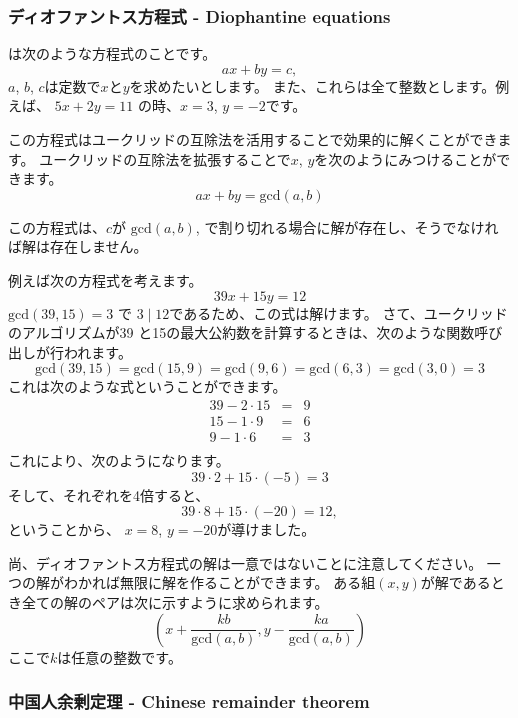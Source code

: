 \subsubsection*{ディオファントス方程式 - Diophantine equations}


は次のような方程式のことです。
\[ ax + by = c, \]
$a$, $b$, $c$は定数で$x$と$y$を求めたいとします。
また、これらは全て整数とします。例えば、
$5x+2y=11$ の時、$x=3$,  $y=-2$です。


この方程式はユークリッドの互除法を活用することで効果的に解くことができます。
ユークリッドの互除法を拡張することで$x$, $y$を次のようにみつけることができます。
\[
ax + by = \textrm{gcd}(a,b)
\]

この方程式は、$c$が
$\textrm{gcd}(a,b)$,
で割り切れる場合に解が存在し、そうでなければ解は存在しません。

例えば次の方程式を考えます。
\[
39x + 15y = 12
\]
$\textrm{gcd}(39,15)=3$ で $3 \mid 12$であるため、この式は解けます。
さて、ユークリッドのアルゴリズムが39 と15の最大公約数を計算するときは、次のような関数呼び出しが行われます。
\[
\textrm{gcd}(39,15) = \textrm{gcd}(15,9)
= \textrm{gcd}(9,6) = \textrm{gcd}(6,3)
= \textrm{gcd}(3,0) = 3 \]
これは次のような式ということができます。
\[
\begin{array}{lcl}
39 - 2 \cdot 15 & = & 9 \\
15 - 1 \cdot 9 & = & 6 \\
9 - 1 \cdot 6 & = & 3 \\
\end{array}
\]
これにより、次のようになります。
\[
39 \cdot 2 + 15 \cdot (-5) = 3
\]
そして、それぞれを4倍すると、
\[
39 \cdot 8 + 15 \cdot (-20) = 12,
\]
ということから、
$x=8$, $y=-20$が導けました。

尚、ディオファントス方程式の解は一意ではないことに注意してください。
一つの解がわかれば無限に解を作ることができます。
ある組$(x,y)$が解であるとき全ての解のペアは次に示すように求められます。
\[(x+\frac{kb}{\textrm{gcd}(a,b)},y-\frac{ka}{\textrm{gcd}(a,b)})\]
ここで$k$は任意の整数です。

\subsubsection{中国人余剰定理 - Chinese remainder theorem}

